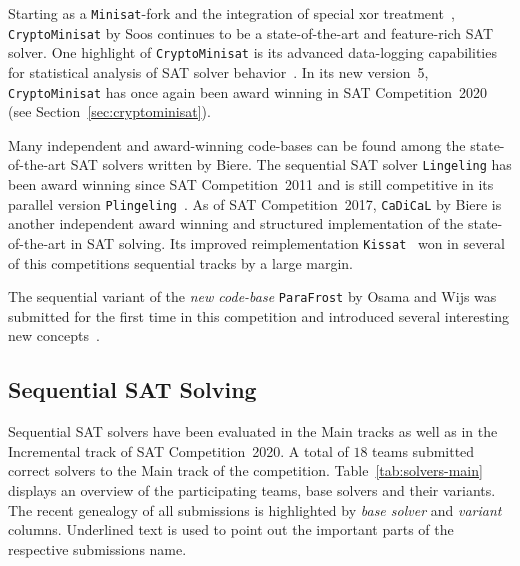 \documentclass{elsarticle}
\newcommand{\solver}[1]{\texttt{#1}}
\begin{document}
Starting as a \solver{Minisat}-fork and the integration of special xor treatment~\cite{Soos:2009:Crypto}, \solver{CryptoMinisat} by Soos continues to be a state-of-the-art and feature-rich SAT solver. 
One highlight of \solver{CryptoMinisat} is its advanced data-logging capabilities for statistical analysis of SAT solver behavior~\cite{Soos:2019:ChrystalBall}. 
In its new version~5, \solver{CryptoMinisat} has once again been award winning in SAT Competition~2020 (see Section~\ref{sec:cryptominisat}). 

Many independent and award-winning code-bases can be found among the state-of-the-art SAT solvers written by Biere. 
The sequential SAT solver \solver{Lingeling} has been award winning since SAT Competition~2011 and is still competitive in its parallel version \solver{Plingeling}~\cite{Biere:2012:Lingeling}. 
As of SAT Competition~2017, \solver{CaDiCaL} %
by Biere is another independent award winning and structured implementation of the state-of-the-art in SAT solving. 
Its improved reimplementation \solver{Kissat}~\cite{Biere:SC2020} won in several of this competitions sequential tracks by a large margin. 

The sequential variant of the \emph{new code-base} \solver{ParaFrost} by Osama and Wijs was submitted for the first time in this competition and introduced several interesting new concepts~\cite{Osama:SC2020:Parafrost}. 


\subsection{Sequential SAT Solving}
\label{sec:part:seq}

Sequential SAT solvers have been evaluated in the Main tracks as well as in the Incremental track of SAT Competition~2020. 
A total of $18$ teams submitted correct solvers to the Main track of the competition. 
Table~\ref{tab:solvers-main} displays an overview of the participating teams, base solvers and their variants. 
The recent genealogy of all submissions is highlighted by \emph{base solver} and \emph{variant} columns. 
Underlined text is used to point out the important parts of the respective submissions name.
\end{document}
